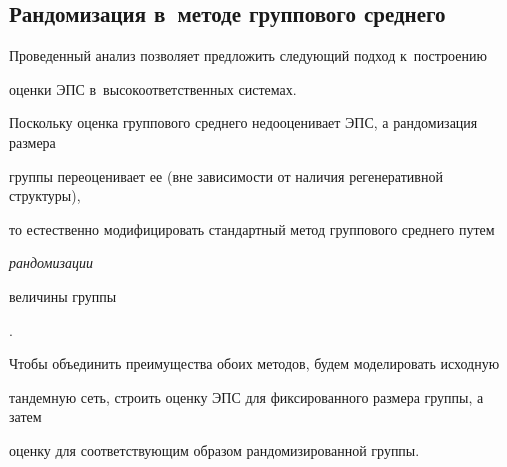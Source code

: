 \subsection{Рандомизация в~методе группового среднего}





Проведенный   анализ  позволяет предложить  следующий подход к~построению  


оценки ЭПС в~высокоответственных системах.


Поскольку оценка  группового среднего недооценивает  ЭПС, а рандомизация размера  


группы  переоценивает  ее (вне зависимости от наличия регенеративной структуры), 


то естественно модифицировать  стандартный метод группового среднего  путем {\it рандомизации 


величины группы}.


Чтобы  объединить преимущества обоих методов,  будем моделировать  исходную 


тандемную сеть, строить оценку ЭПС для   фиксированного размера  группы, а затем 


оценку  для соответствующим образом  рандомизированной группы.





